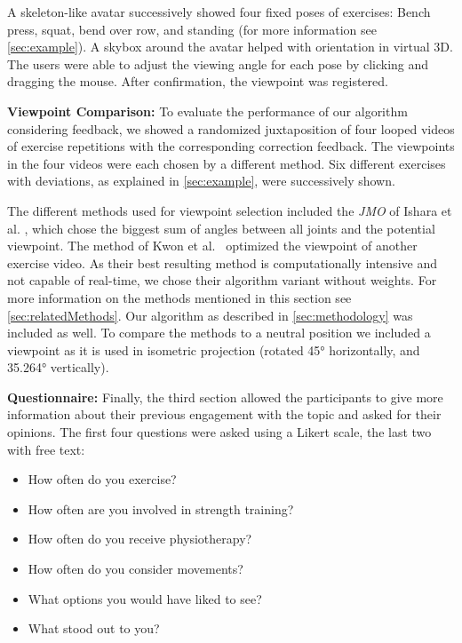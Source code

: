A skeleton-like avatar successively showed four fixed poses of exercises: Bench press, squat, bend over row, and standing (for more information see \autoref{sec:example}). A skybox around the avatar helped with orientation in virtual 3D. The users were able to adjust the viewing angle for each pose by clicking and dragging the mouse. After confirmation, the viewpoint was registered.

\textbf{Viewpoint Comparison:} To evaluate the performance of our algorithm considering feedback, we showed a randomized juxtaposition of four looped videos of exercise repetitions with the corresponding correction feedback. The viewpoints in the four videos were each chosen by a different method. Six different exercises with deviations, as explained in \autoref{sec:example}, were successively shown.  

The different methods used for viewpoint selection included the \emph{JMO} of Ishara et al. \cite{ishara2015mra}, which chose the biggest sum of angles between all joints and the potential viewpoint. The method of Kwon et al.~\cite{kwon2020ocp} optimized the viewpoint of another exercise video. As their best resulting method is computationally intensive and not capable of real-time, we chose their algorithm variant without weights. For more information on the methods mentioned in this section see \autoref{sec:relatedMethods}. Our algorithm as described in \autoref{sec:methodology} was included as well. To compare the methods to a neutral position we included a viewpoint as it is used in isometric projection (rotated 45° horizontally, and 35.264° vertically).

\textbf{Questionnaire:} Finally, the third section allowed the participants to give more information about their previous engagement with the topic and asked for their opinions. The first four questions were asked using a Likert scale, the last two with free text:

\begin{itemize}
	\item How often do you exercise?
	\item How often are you involved in strength training?
	\item How often do you receive physiotherapy? 
	\item How often do you consider movements?
	\item What options you would have liked to see?
	\item What stood out to you?
\end{itemize}

